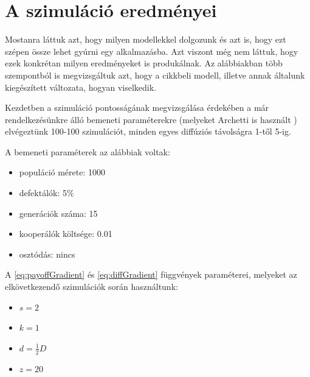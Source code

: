 
\chapter{A szimuláció eredményei}

Mostanra láttuk azt, hogy milyen modellekkel dolgozunk és azt is, hogy ezt szépen össze lehet gyúrni egy alkalmazásba. Azt viszont még nem láttuk, hogy ezek konkrétan milyen eredményeket is produkálnak. Az alábbiakban több szempontból is megvizsgáltuk azt, hogy a \cite{archetti2016cooperation} cikkbeli modell, illetve annak általunk kiegészített változata, hogyan viselkedik.

Kezdetben a szimuláció pontosságának megvizsgálása érdekében a már rendelkezésünkre álló bemeneti paraméterekre (melyeket Archetti is használt \cite{archetti2016cooperation}) elvégeztünk 100-100 szimulációt, minden egyes diffúziós távolságra 1-től 5-ig.

A bemeneti paraméterek az alábbiak voltak:
\begin{itemize}
	\item populáció mérete: 1000
	\item defektálók: 5\%
	\item generációk száma: 15
	\item kooperálók költsége: 0.01
	\item osztódás: nincs
\end{itemize}

A \eqref{eq:payoffGradient} és \eqref{eq:diffGradient} függvények paraméterei, melyeket az elkövetkezendő szimulációk során használtunk:
\begin{itemize}
	\item $s = 2$
	\item $k = 1$
	\item $d = \frac{1}{2}D$
	\item $z = 20$
\end{itemize}

